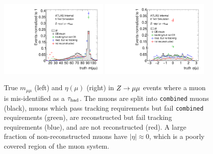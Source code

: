 \begin{figure}[tp]
  \centering
  \includegraphics[width=0.48\textwidth]{figures/tauperformance/muonfakes_mll}
  \includegraphics[width=0.48\textwidth]{figures/tauperformance/muonfakes_eta}
  \caption{True $m_{\mu\mu}$ (left) and $\eta(\mu)$ (right) in $Z \rightarrow \mu\mu$ events where a muon is mis-identified as a $\tau_\text{had}$. The muons are split into \texttt{combined} muons (black), muons which pass tracking requirements but fail \texttt{combined} requirements (green), are reconstructed but fail tracking requirements (blue), and are not reconstructed (red). A large fraction of non-reconstructed muons have $|\eta| \approx 0$, which is a poorly covered region of the muon system.}
  \label{fig:taus-muonfakes-1}
\end{figure}

